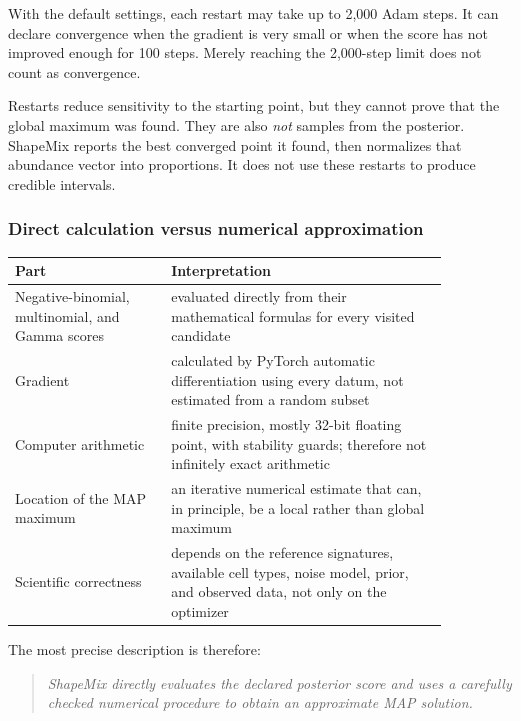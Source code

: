 \documentclass[11pt]{article}
\begin{document}
With the default settings, each restart may take up to 2,000 Adam steps. It can
declare convergence when the gradient is very small or when the score has not
improved enough for 100 steps. Merely reaching the 2,000-step limit does not
count as convergence.

\begin{watchout}
Restarts reduce sensitivity to the starting point, but they cannot prove that
the global maximum was found. They are also \emph{not} samples from the
posterior. ShapeMix reports the best converged point it found, then normalizes
that abundance vector into proportions. It does not use these restarts to
produce credible intervals.
\end{watchout}

\subsubsection*{Direct calculation versus numerical approximation}

\begin{center}
\begin{tabular}{L{0.31\linewidth}L{0.55\linewidth}}
\toprule
Part & Interpretation \\
\midrule
Negative-binomial, multinomial, and Gamma scores & evaluated directly from
their mathematical formulas for every visited candidate \\
Gradient & calculated by PyTorch automatic differentiation using every datum,
not estimated from a random subset \\
Computer arithmetic & finite precision, mostly 32-bit floating point, with
stability guards; therefore not infinitely exact arithmetic \\
Location of the MAP maximum & an iterative numerical estimate that can, in
principle, be a local rather than global maximum \\
Scientific correctness & depends on the reference signatures, available cell
types, noise model, prior, and observed data, not only on the optimizer \\
\bottomrule
\end{tabular}
\end{center}

The most precise description is therefore:

\begin{quote}
\emph{ShapeMix directly evaluates the declared posterior score and uses a
carefully checked numerical procedure to obtain an approximate MAP solution.}
\end{quote}
\end{document}
